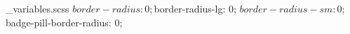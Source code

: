 {\_variables.scss}
$border-radius: 0;
$border-radius-lg: 0;
$border-radius-sm: 0;
$badge-pill-border-radius: 0;
